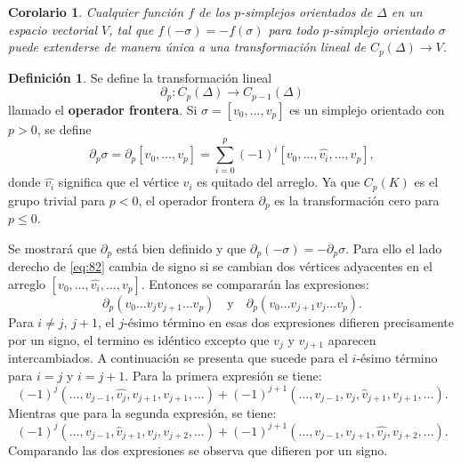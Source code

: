 \documentclass[12pt]{book}
\newtheorem{corollary}[theorem]{Corolario}
\theoremstyle{definition}
\newtheorem{definition}[theorem]{Definición}
\newcounter{in}
\newcounter{ini}
\begin{document}
\begin{corollary}
  \label{corf}
  Cualquier función $f$ de los $p$-simplejos orientados de $\Delta$ en
  un espacio vectorial $V$, tal que $f(- \sigma) = -f(\sigma)$ para
  todo $p$-simplejo orientado $\sigma$ puede extenderse de manera
  única a una transformación lineal de $C_{p}(\Delta) \to V$.
\end{corollary}

\begin{definition}
  \label{bo}
  Se define la transformación lineal
  \begin{equation}
    \label{eq:82}
    \partial_{p} \colon C_{p}(\Delta) \to C_{p-1}(\Delta)
  \end{equation}
  llamado el \textbf{operador frontera}. Si
  $\sigma = [v_{0}, \ldots, v_{p}]$ es un simplejo orientado con
  $p > 0 $, se define
  \begin{equation}
    \label{eq:83}
    \partial_{p} \sigma = \partial_{p} [v_{0}, \ldots, v_{p}] = \sum_{i=0}^{p} (-1)^{i} [v_{0}, \ldots,\hat{v_{i}},\ldots, v_{p}],
  \end{equation}
  donde $\hat{v_{i}}$ significa que el vértice $v_{i}$ es quitado del
  arreglo. Ya que $C_{p}(K)$ es el grupo trivial para $p < 0$, el
  operador frontera $\partial_{p}$ es la transformación cero para $p \leq 0$.
\end{definition}
Se mostrará que $\partial_{p}$ está bien definido y que
$\partial_{p}(-\sigma) = -\partial_{p}\sigma$. Para ello el lado
derecho de \ref{eq:82} cambia de signo si se cambian dos vértices
adyacentes en el arreglo $[v_{0}, \ldots,\hat{v_{i}},\ldots,
v_{p}]$. Entonces se compararán las expresiones:
\begin{equation}
  \label{eq:84}
  \partial_{p}(v_{0}\ldots v_{j} v_{j+1} \ldots v_{p}) \quad \mathrm{y} \quad \partial_{p}(v_{0} \ldots v_{j+1} v_{j} \ldots v_{p}).
\end{equation}
Para $i \neq j$, $j + 1$, el $j$-ésimo término en esas dos expresiones
difieren precisamente por un signo, el termino es idéntico excepto que
$v_{j}$ y $v_{j+1}$ aparecen intercambiados. A continuación se
presenta que sucede para el $i$-ésimo término para $i = j$ y
$i = j+1$. Para la primera expresión se tiene:
\begin{equation}
  \label{eq:85}
    (-1)^{j} (\ldots,v_{j-1},\hat{v_{j}}, v_{j+1}, v_{j+1},\ldots)  + (-1)^{j+1} (\ldots,v_{j-1},v_{j},\hat{v}_{j+1}, v_{j+1},\ldots).
  \end{equation}
Mientras que para la segunda expresión, se tiene:
  \begin{equation}
    \label{eq:87}
    (-1)^{j} (\ldots,v_{j-1},\hat{v}_{j+1}, v_{j}, v_{j+2},\ldots)  + (-1)^{j+1} (\ldots,v_{j-1},v_{j+1},\hat{v_{j}}, v_{j+2},\ldots). 
  \end{equation}
  Comparando las dos expresiones se observa que difieren por un signo.
\end{document}
